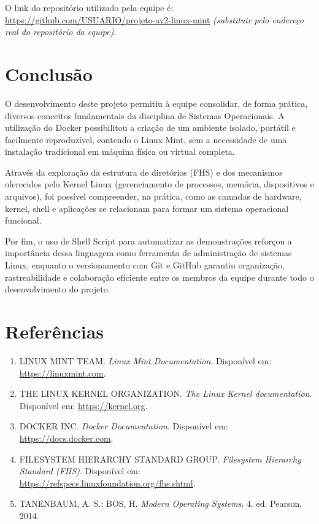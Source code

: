 \documentclass[a4paper,12pt]{article}
\begin{document}
O link do repositório utilizado pela equipe é:
\url{https://github.com/USUARIO/projeto-av2-linux-mint}
\textit{(substituir pelo endereço real do repositório da equipe)}.


\section{Conclusão}

O desenvolvimento deste projeto permitiu à equipe consolidar, de forma
prática, diversos conceitos fundamentais da disciplina de Sistemas
Operacionais. A utilização do Docker possibilitou a criação de um ambiente
isolado, portátil e facilmente reproduzível, contendo o Linux Mint, sem a
necessidade de uma instalação tradicional em máquina física ou virtual
completa.

Através da exploração da estrutura de diretórios (FHS) e dos mecanismos
oferecidos pelo Kernel Linux (gerenciamento de processos, memória,
dispositivos e arquivos), foi possível compreender, na prática, como as
camadas de hardware, kernel, shell e aplicações se relacionam para formar um
sistema operacional funcional.

Por fim, o uso de Shell Script para automatizar as demonstrações reforçou a
importância dessa linguagem como ferramenta de administração de sistemas
Linux, enquanto o versionamento com Git e GitHub garantiu organização,
rastreabilidade e colaboração eficiente entre os membros da equipe durante
todo o desenvolvimento do projeto.


\section{Referências}

\sloppy
\begin{enumerate}
    \item LINUX MINT TEAM. \textit{Linux Mint Documentation}. Disponível em:
          \url{https://linuxmint.com}.
    \item THE LINUX KERNEL ORGANIZATION. \textit{The Linux Kernel
          documentation}. Disponível em: \url{https://kernel.org}.
    \item DOCKER INC. \textit{Docker Documentation}. Disponível em:
          \url{https://docs.docker.com}.
    \item FILESYSTEM HIERARCHY STANDARD GROUP. \textit{Filesystem
          Hierarchy Standard (FHS)}. Disponível em:
          \url{https://refspecs.linuxfoundation.org/fhs.shtml}.
    \item TANENBAUM, A. S.; BOS, H. \textit{Modern Operating Systems}.
          4. ed. Pearson, 2014.
\end{enumerate}
\end{document}
